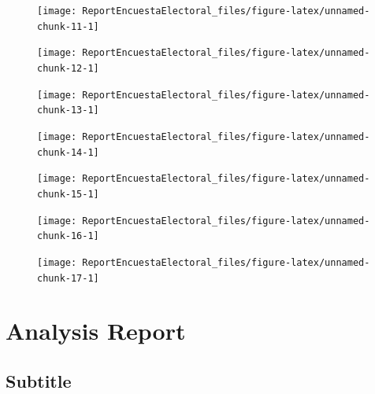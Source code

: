 \documentclass[10,a4paperpaper,]{article}
\begin{document}
\begin{figure}[!htb]
  \centering

\texttt{[image: ReportEncuestaElectoral\_files/figure-latex/unnamed-chunk-11-1]} 
\end{figure}

\newpage

\begin{figure}[!htb]
  \begin{minipage}{0.3\textwidth}
    \centering

\texttt{[image: ReportEncuestaElectoral\_files/figure-latex/unnamed-chunk-12-1]} 
  \end{minipage}\hfill
  \begin{minipage}{0.3\textwidth}
    \centering

\texttt{[image: ReportEncuestaElectoral\_files/figure-latex/unnamed-chunk-13-1]} 
  \end{minipage}
    \begin{minipage}{0.3\textwidth}
    \centering

\texttt{[image: ReportEncuestaElectoral\_files/figure-latex/unnamed-chunk-14-1]} 
  \end{minipage}
\end{figure}

\begin{figure}[!htb]
  \begin{minipage}{0.3\textwidth}
  \centering

\texttt{[image: ReportEncuestaElectoral\_files/figure-latex/unnamed-chunk-15-1]} 

  \end{minipage}\hfill
  \begin{minipage}{0.3\textwidth}
    \centering

\texttt{[image: ReportEncuestaElectoral\_files/figure-latex/unnamed-chunk-16-1]} 
  \end{minipage}
  \begin{minipage}{0.3\textwidth}
    \centering

\texttt{[image: ReportEncuestaElectoral\_files/figure-latex/unnamed-chunk-17-1]} 
\end{minipage}
\end{figure}

\newpage

\section{Analysis Report}

\subsection{Subtitle}
\end{document}
